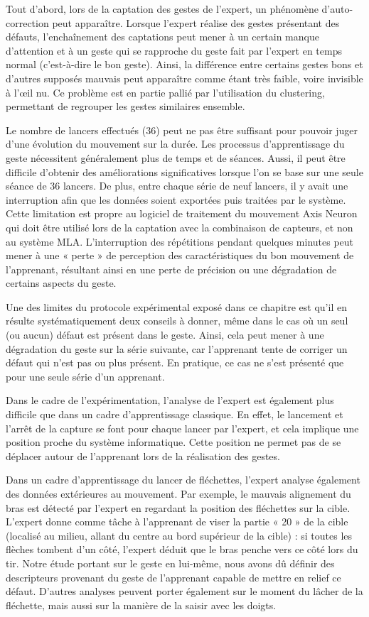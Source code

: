 Tout d'abord, lors de la captation des gestes de l'expert, un phénomène d'auto-correction peut apparaître. Lorsque l'expert réalise des gestes présentant des défauts, l'enchaînement des captations peut mener à un certain manque d'attention et à un geste qui se rapproche du geste fait par l'expert en temps normal (c'est-à-dire le bon geste). Ainsi, la différence entre certains gestes bons et d'autres supposés mauvais peut apparaître comme étant très faible, voire invisible à l'œil nu. Ce problème est en partie pallié par l'utilisation du clustering, permettant de regrouper les gestes similaires ensemble.

Le nombre de lancers effectués (36) peut ne pas être suffisant pour pouvoir juger d'une évolution du mouvement sur la durée. Les processus d'apprentissage du geste nécessitent généralement plus de temps et de séances. Aussi, il peut être difficile d'obtenir des améliorations significatives lorsque l'on se base sur une seule séance de 36 lancers. De plus, entre chaque série de neuf lancers, il y avait une interruption afin que les données soient exportées puis traitées par le système. Cette limitation est propre au logiciel de traitement du mouvement Axis Neuron qui doit être utilisé lors de la captation avec la combinaison de capteurs, et non au système MLA. L'interruption des répétitions pendant quelques minutes peut mener à une « perte » de perception des caractéristiques du bon mouvement de l'apprenant, résultant ainsi en une perte de précision ou une dégradation de certains aspects du geste.

Une des limites du protocole expérimental exposé dans ce chapitre est qu'il en résulte systématiquement deux conseils à donner, même dans le cas où un seul (ou aucun) défaut est présent dans le geste. Ainsi, cela peut mener à une dégradation du geste sur la série suivante, car l'apprenant tente de corriger un défaut qui n'est pas ou plus présent. En pratique, ce cas ne s'est présenté que pour une seule série d'un apprenant.

Dans le cadre de l'expérimentation, l'analyse de l'expert est également plus difficile que dans un cadre d'apprentissage classique. En effet, le lancement et l'arrêt de la capture se font pour chaque lancer par l'expert, et cela implique une position proche du système informatique. Cette position ne permet pas de se déplacer autour de l'apprenant lors de la réalisation des gestes.

Dans un cadre d'apprentissage du lancer de fléchettes, l'expert analyse également des données extérieures au mouvement. Par exemple, le mauvais alignement du bras est détecté par l'expert en regardant la position des fléchettes sur la cible. L'expert donne comme tâche à l'apprenant de viser la partie « 20 » de la cible (localisé au milieu, allant du centre au bord supérieur de la cible) : si toutes les flèches tombent d'un côté, l'expert déduit que le bras penche vers ce côté lors du tir. Notre étude portant sur le geste en lui-même, nous avons dû définir des descripteurs provenant du geste de l'apprenant capable de mettre en relief ce défaut. D'autres analyses peuvent porter également sur le moment du lâcher de la fléchette, mais aussi sur la manière de la saisir avec les doigts.

